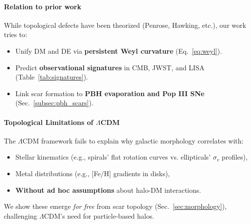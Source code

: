 \documentclass{article}
\begin{document}
\paragraph{Relation to prior work}  
   While topological defects have been theorized (Penrose, Hawking, etc.), our work tries to:  
   \begin{itemize}  
     \item Unify DM and DE via \textbf{persistent Weyl curvature} (Eq.~\ref{eq:weyl}).  
     \item Predict \textbf{observational signatures} in CMB, JWST, and LISA (Table~\ref{tab:signatures}).  
     \item Link scar formation to \textbf{PBH evaporation and Pop III SNe} (Sec.~\ref{subsec:pbh_scars}).
   \end{itemize}  

\paragraph{Topological Limitations of $\Lambda$CDM}  
The $\Lambda$CDM framework fails to explain why galactic morphology correlates with:  
\begin{itemize}  
    \item Stellar kinematics (e.g., spirals' flat rotation curves vs. ellipticals' $\sigma_v$ profiles),  
    \item Metal distributions (e.g., [Fe/H] gradients in disks),  
    \item \textbf{Without ad hoc assumptions} about halo-DM interactions.  
\end{itemize}  
We show these emerge \textit{for free} from scar topology (Sec.~\ref{sec:morphology}), challenging $\Lambda$CDM's need for particle-based halos.  
\end{document}
